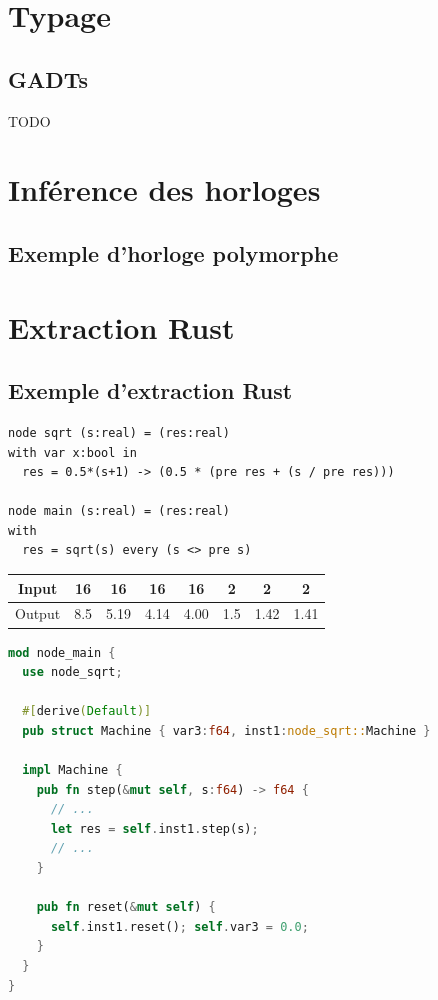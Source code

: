 \documentclass[11pt,usenames,dvipsnames]{beamer}
\begin{document}
\section{Typage}
\subsection{GADTs}
\begin{frame}{\null}
  TODO
\end{frame}

\section{Inférence des horloges}
\subsection{Exemple d'horloge polymorphe}
\begin{frame}[fragile]{\null}
  
\end{frame}


\section{Extraction Rust}
\subsection{Exemple d'extraction Rust}

\begin{frame}[fragile]{\null}
  \begin{lstlisting}[language=minils]
node sqrt (s:real) = (res:real)
with var x:bool in
  res = 0.5*(s+1) -> (0.5 * (pre res + (s / pre res)))

node main (s:real) = (res:real)
with
  res = sqrt(s) every (s <> pre s)
  \end{lstlisting}

  \begin{tabular}{|c|ccccccc|}
    \hline
    Input  & 16   & 16   & 16   & 16   & 2   & 2    & 2   \\
    \hline
    Output & 8.5  & 5.19 & 4.14 & 4.00 & 1.5 & 1.42 & 1.41 \\
    \hline                                                      
\end{tabular}
\end{frame}

  \begin{frame}[fragile]{\null}
  \begin{lstlisting}[language=Rust]
mod node_main {
  use node_sqrt;
    
  #[derive(Default)]
  pub struct Machine { var3:f64, inst1:node_sqrt::Machine }
  
  impl Machine {
    pub fn step(&mut self, s:f64) -> f64 {
      // ...
      let res = self.inst1.step(s);
      // ...
    }
    
    pub fn reset(&mut self) {
      self.inst1.reset(); self.var3 = 0.0;
    }
  }
}
\end{lstlisting}
\end{frame}
\end{document}
